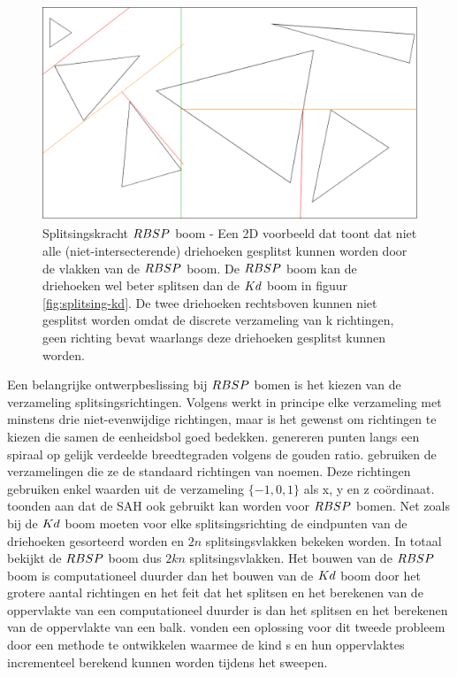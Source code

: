     \begin{figure}
        \centering
        \includegraphics[width=\linewidth]{img/splitsing-RBSP}
        \caption[Splitsingskracht $\symRBSP$ boom]{Splitsingskracht $\symRBSP$ boom - \small Een 2D voorbeeld dat toont dat niet alle (niet-intersecterende) driehoeken gesplitst kunnen worden door de vlakken van de $\symRBSP$ boom. De $\symRBSP$ boom kan de driehoeken wel beter splitsen dan de $Kd$ boom in figuur \ref{fig:splitsing-kd}. De twee driehoeken rechtsboven kunnen niet gesplitst worden omdat de discrete verzameling van k richtingen, geen richting bevat waarlangs deze driehoeken gesplitst kunnen worden.}
        \label{fig:splitsing-rbsp}    
    \end{figure}

    Een belangrijke ontwerpbeslissing bij $\symRBSP$ bomen is het kiezen van de verzameling splitsingsrichtingen. 
    Volgens \authorBudge{} \cite{Budge} werkt in principe elke verzameling met minstens drie niet-evenwijdige richtingen, maar is het gewenst om richtingen te kiezen die samen de eenheidsbol goed bedekken.
    \authorKammaje{} \cite{Kammaje} genereren punten langs een spiraal op gelijk verdeelde breedtegraden volgens de gouden ratio.
    \authorBudge{} \cite{Budge} gebruiken de verzamelingen die ze de standaard richtingen van \authorKlosowki{} \cite{klosowski1998efficient} noemen.
    Deze richtingen gebruiken enkel waarden uit de verzameling $\{-1, 0, 1\}$ als x, y en z coördinaat. %
    \\

    \authorKammaje{} \cite{Kammaje} toonden aan dat de SAH ook gebruikt kan worden voor $\symRBSP$ bomen. Net zoals bij de $Kd$ boom moeten voor elke splitsingsrichting de eindpunten van de driehoeken gesorteerd worden en $2n$ splitsingsvlakken bekeken worden. In totaal bekijkt de $\symRBSP$ boom dus $2kn$ splitsingsvlakken. Het bouwen van de $\symRBSP$ boom is computationeel duurder dan het bouwen van de $Kd$ boom door het grotere aantal richtingen en het feit dat het splitsen en het berekenen van de oppervlakte van een \symKDOP{} computationeel duurder is dan het splitsen en het berekenen van de oppervlakte van een balk. \authorBudge{} \cite{Budge} vonden een oplossing voor dit tweede probleem door een methode te ontwikkelen waarmee de kind \symKDOP s en hun oppervlaktes incrementeel berekend kunnen worden tijdens het sweepen.\\

